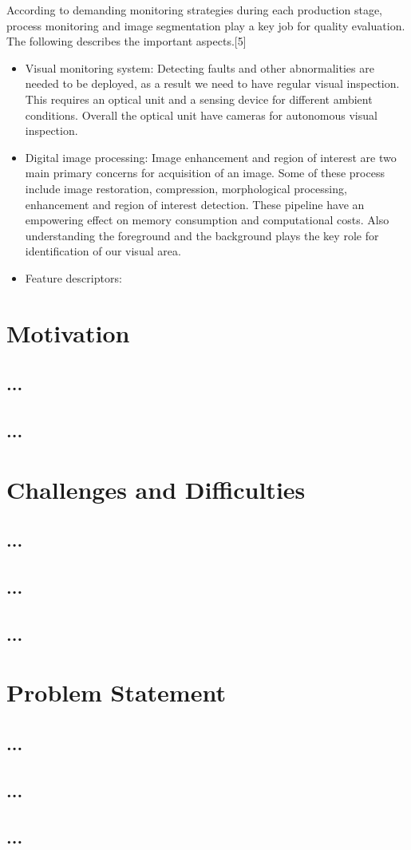 	According to demanding monitoring strategies during each production stage, process monitoring and image segmentation play a key job for quality evaluation. The following describes  the important aspects.[5]
	\begin{itemize}
	\item Visual monitoring system: Detecting faults and other abnormalities are needed to be deployed, as a result we need to have regular visual inspection. This requires an optical unit and a sensing device for different ambient conditions. Overall the optical unit have cameras for autonomous visual inspection.
	\item Digital image processing: Image enhancement and region of interest are two main primary concerns for acquisition of an image. Some of these process include image restoration, compression, morphological processing, enhancement and region of interest detection. These pipeline have an empowering effect on memory consumption and computational costs. Also understanding the foreground and the background plays the key role for identification of our visual area.
	\item Feature descriptors:
	\end{itemize}


    \section{Motivation}
    \subsection{...}


    \subsection{...}


    \section{Challenges and Difficulties}
    \subsection{...}


    \subsection{...}

    \subsection{...}



    \section{Problem Statement}
    \subsection{...}


    \subsection{...}


    \subsection{...}

